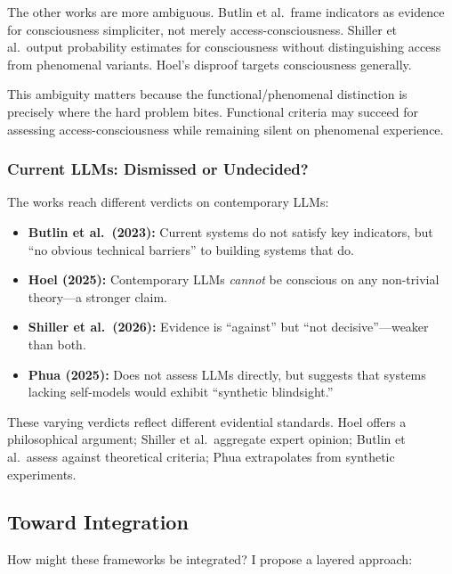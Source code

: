 The other works are more ambiguous. Butlin et al.\ frame indicators as evidence for consciousness simpliciter, not merely access-consciousness. Shiller et al.\ output probability estimates for consciousness without distinguishing access from phenomenal variants. Hoel's disproof targets consciousness generally.

This ambiguity matters because the functional/phenomenal distinction is precisely where the hard problem bites. Functional criteria may succeed for assessing access-consciousness while remaining silent on phenomenal experience.

\subsubsection{Current LLMs: Dismissed or Undecided?}

The works reach different verdicts on contemporary LLMs:

\begin{itemize}
    \item \textbf{Butlin et al.\ (2023):} Current systems do not satisfy key indicators, but ``no obvious technical barriers'' to building systems that do.

    \item \textbf{Hoel (2025):} Contemporary LLMs \emph{cannot} be conscious on any non-trivial theory---a stronger claim.

    \item \textbf{Shiller et al.\ (2026):} Evidence is ``against'' but ``not decisive''---weaker than both.

    \item \textbf{Phua (2025):} Does not assess LLMs directly, but suggests that systems lacking self-models would exhibit ``synthetic blindsight.''
\end{itemize}

These varying verdicts reflect different evidential standards. Hoel offers a philosophical argument; Shiller et al.\ aggregate expert opinion; Butlin et al.\ assess against theoretical criteria; Phua extrapolates from synthetic experiments.

\subsection{Toward Integration}

How might these frameworks be integrated? I propose a layered approach:

